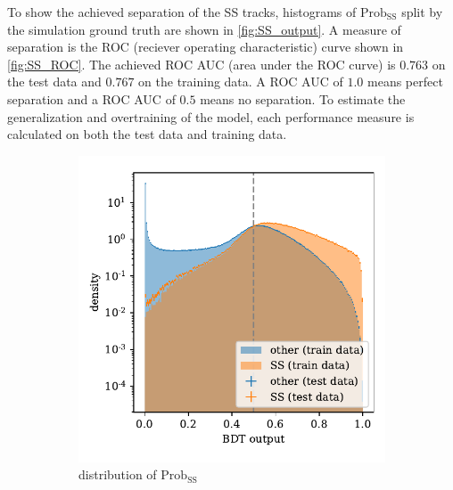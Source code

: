 To show the achieved separation of the SS tracks, histograms of $\text{Prob}_\text{SS}$ split by the simulation ground truth are shown in \autoref{fig:SS_output}.
A measure of separation is the ROC (reciever operating characteristic) curve shown in \autoref{fig:SS_ROC}.
The achieved ROC AUC (area under the ROC curve) is $0.763$ on the test data and $0.767$ on the training data.
A ROC AUC of $1.0$ means perfect separation and a ROC AUC of $0.5$ means no separation.
To estimate the generalization and overtraining of the model, each performance measure is calculated on both the test data and training data.

\begin{figure}
    \centering
    \begin{subfigure}{0.5\textwidth}
        \centering
        \includegraphics[width=\textwidth]{images/SS_output.pdf}
        \caption{distribution of $\text{Prob}_\text{SS}$}
        \label{fig:SS_output}
    \end{subfigure}%
    \begin{subfigure}{0.5\textwidth}
        \centering

\end{subfigure}
\end{figure}
